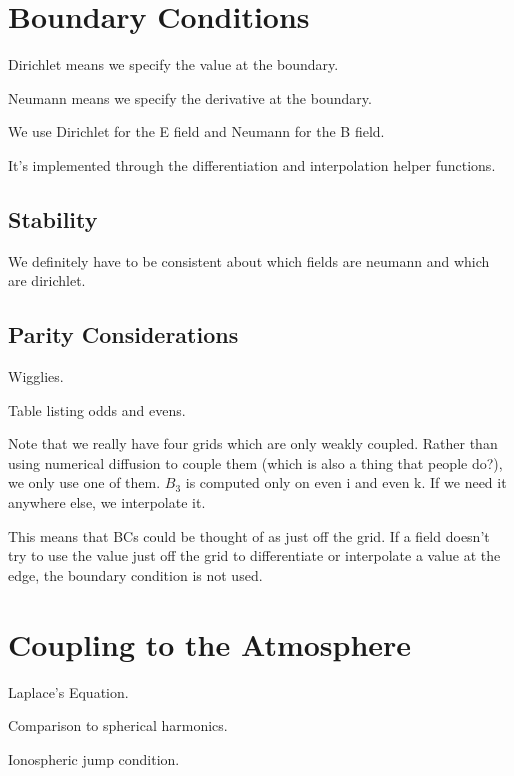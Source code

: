 \section{Boundary Conditions}

Dirichlet means we specify the value at the boundary. 

Neumann means we specify the derivative at the boundary. 

We use Dirichlet for the E field and Neumann for the B field. 

It's implemented through the differentiation and interpolation helper functions. 

\subsection{Stability}

We definitely have to be consistent about which fields are neumann and which are dirichlet. 

\subsection{Parity Considerations}

Wigglies. 

Table listing odds and evens. 

Note that we really have four grids which are only weakly coupled. Rather than using numerical diffusion to couple them (which is also a thing that people do?), we only use one of them. $B_3$ is computed only on even i and even k. If we need it anywhere else, we interpolate it. 

This means that BCs could be thought of as just off the grid. If a field doesn't try to use the value just off the grid to differentiate or interpolate a value at the edge, the boundary condition is not used. 

\section{Coupling to the Atmosphere}

Laplace's Equation. 

Comparison to spherical harmonics. 

Ionospheric jump condition. 

